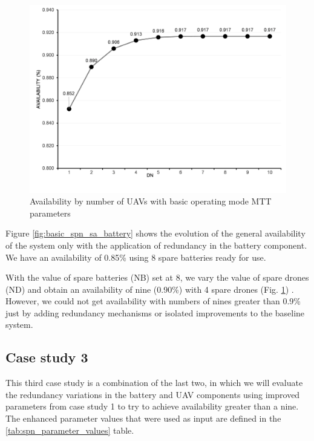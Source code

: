 \documentclass[conference]{IEEEtran}
\begin{document}
\begin{figure}[htbp]
\centerline{\includegraphics[scale=0.45]{img/exps/SA_003.png}}
\caption{Availability by number of UAVs with basic operating mode MTT parameters}
\label{fig:basic_spn_sa_uav}
\end{figure}


Figure \ref{fig:basic_spn_sa_battery} shows the evolution of the general availability of the system only with the application of redundancy in the battery component. We have an availability of 0.85\% using 8 spare batteries ready for use.

With the value of spare batteries (NB) set at 8, we vary the value of spare drones (ND) and obtain an availability of nine (0.90\%) with 4 spare drones (Fig. \ref{fig:basic_spn_sa_uav}) . However, we could not get availability with numbers of nines greater than 0.9\% just by adding redundancy mechanisms or isolated improvements to the baseline system.


\subsection{Case study 3}\label{sec:case_studies_sub03}

This third case study is a combination of the last two, in which we will evaluate the redundancy variations in the battery and UAV components using improved parameters from case study 1 to try to achieve availability greater than a nine. The enhanced parameter values that were used as input are defined in the \ref{tab:spn_parameter_values} table.
\end{document}
